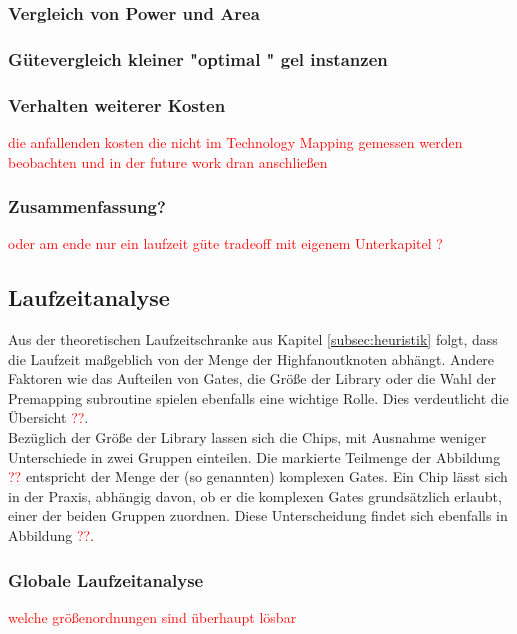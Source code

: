 \documentclass[11pt, a4paper, german]{article}
\newcommand{\TM}{Technology  Mapping }
\begin{document}
\subsubsection{Vergleich von Power und Area}


\subsubsection{Gütevergleich kleiner "optimal " gel instanzen}
\label{subsubsec:guetevgl_kleiner_opt_instanzen}


\subsubsection{Verhalten weiterer Kosten}
\textcolor{red}{die anfallenden kosten die nicht im \TM gemessen werden beobachten und in der future work dran anschließen}

\subsubsection{Zusammenfassung?}
\textcolor{red}{oder am ende nur ein laufzeit güte tradeoff mit eigenem Unterkapitel ?} 
 
 
 \subsection{Laufzeitanalyse}
 \label{subsec:laufzeitanalyse}
Aus der theoretischen Laufzeitschranke aus Kapitel \ref{subsec:heuristik} folgt, dass die Laufzeit maßgeblich von der Menge der Highfanoutknoten abhängt. Andere Faktoren wie das Aufteilen von Gates, die Größe der Library oder die Wahl der Premapping subroutine spielen ebenfalls eine wichtige Rolle. Dies verdeutlicht die Übersicht \textcolor{red}{??}.\\
 Bezüglich der Größe der Library lassen sich die Chips, mit Ausnahme weniger Unterschiede in zwei Gruppen einteilen. Die markierte Teilmenge der Abbildung \textcolor{red}{??} entspricht der Menge der (so genannten) komplexen Gates. Ein Chip lässt sich in der Praxis, abhängig davon, ob er die komplexen Gates grundsätzlich erlaubt, einer der beiden Gruppen zuordnen. Diese Unterscheidung findet sich ebenfalls in Abbildung \textcolor{red}{??}.
 
\subsubsection{Globale Laufzeitanalyse}
\textcolor{red}{welche größenordnungen sind überhaupt lösbar}
\end{document}
